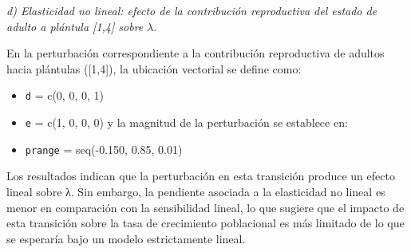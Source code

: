 \documentclass[
  12pt,
  letterpaper,
]{book}
\providecommand{\tightlist}{%
  \setlength{\itemsep}{0pt}\setlength{\parskip}{0pt}}\usepackage{longtable,booktabs,array}
\begin{document}
\emph{d) Elasticidad no lineal: efecto de la contribución reproductiva
del estado de adulto a plántula {[}1,4{]} sobre} \(\lambda\).

En la perturbación correspondiente a la contribución reproductiva de
adultos hacia plántulas ({[}1,4{]}), la ubicación vectorial se define
como:

\begin{itemize}
\tightlist
\item
  \texttt{d} = c(0, 0, 0, 1)
\item
  \texttt{e} = c(1, 0, 0, 0) y la magnitud de la perturbación se
  establece en:
\item
  \texttt{prange} = seq(-0.150, 0.85, 0.01)
\end{itemize}

Los resultados indican que la perturbación en esta transición produce un
efecto lineal sobre λ. Sin embargo, la pendiente asociada a la
elasticidad no lineal es menor en comparación con la sensibilidad
lineal, lo que sugiere que el impacto de esta transición sobre la tasa
de crecimiento poblacional es más limitado de lo que se esperaría bajo
un modelo estrictamente lineal.
\end{document}
